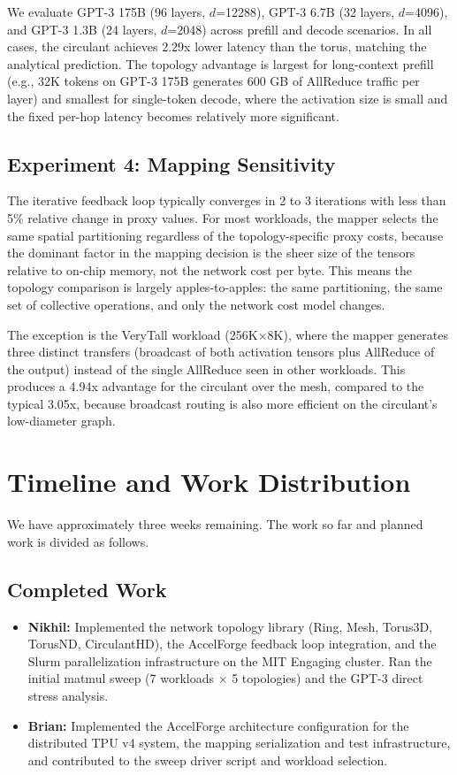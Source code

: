 \documentclass[conference,onecolumn]{IEEEtran}
\begin{document}
We evaluate GPT-3 175B (96 layers, $d$=12288), GPT-3 6.7B (32 layers, $d$=4096), and GPT-3 1.3B (24 layers, $d$=2048) across prefill and decode scenarios. In all cases, the circulant achieves 2.29x lower latency than the torus, matching the analytical prediction. The topology advantage is largest for long-context prefill (e.g., 32K tokens on GPT-3 175B generates 600 GB of AllReduce traffic per layer) and smallest for single-token decode, where the activation size is small and the fixed per-hop latency becomes relatively more significant.

\subsection{Experiment 4: Mapping Sensitivity}

The iterative feedback loop typically converges in 2 to 3 iterations with less than 5\% relative change in proxy values. For most workloads, the mapper selects the same spatial partitioning regardless of the topology-specific proxy costs, because the dominant factor in the mapping decision is the sheer size of the tensors relative to on-chip memory, not the network cost per byte. This means the topology comparison is largely apples-to-apples: the same partitioning, the same set of collective operations, and only the network cost model changes.

The exception is the VeryTall workload (256K$\times$8K), where the mapper generates three distinct transfers (broadcast of both activation tensors plus AllReduce of the output) instead of the single AllReduce seen in other workloads. This produces a 4.94x advantage for the circulant over the mesh, compared to the typical 3.05x, because broadcast routing is also more efficient on the circulant's low-diameter graph.


\section{Timeline and Work Distribution}

We have approximately three weeks remaining. The work so far and planned work is divided as follows.

\subsection{Completed Work}
\begin{itemize}
    \item \textbf{Nikhil:} Implemented the network topology library (Ring, Mesh, Torus3D, TorusND, CirculantHD), the AccelForge feedback loop integration, and the Slurm parallelization infrastructure on the MIT Engaging cluster. Ran the initial matmul sweep (7 workloads $\times$ 5 topologies) and the GPT-3 direct stress analysis.
    \item \textbf{Brian:} Implemented the AccelForge architecture configuration for the distributed TPU v4 system, the mapping serialization and test infrastructure, and contributed to the sweep driver script and workload selection.
\end{itemize}
\end{document}
